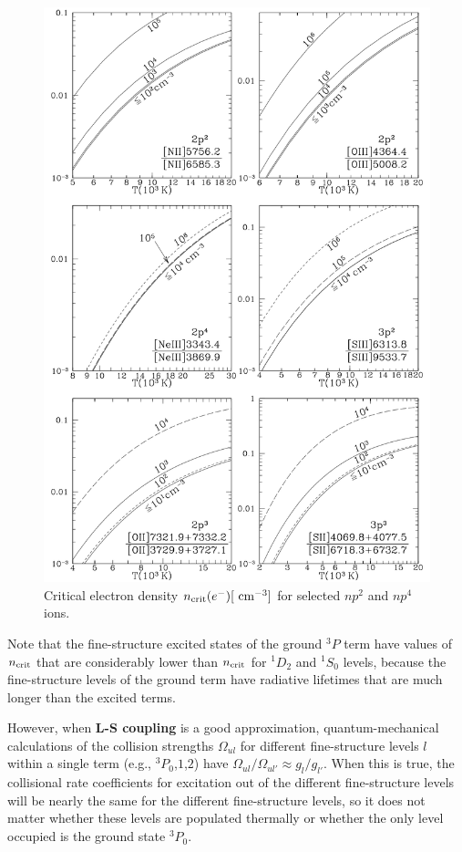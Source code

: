 \documentclass[a4paper,10pt]{article}
\begin{document}
\begin{figure}[t!]
    \centering
    \includegraphics[width=14cm]{figures/LineRatios_T.png}
    \caption{\footnotesize{Critical electron density $n_{\rm crit}(e^-)[~{\rm cm^{-3}}]$ for selected $np^2$ and $np^4$ ions.}}
    \label{fig:lineratios_t}
\end{figure}

{\noindent}Note that the fine-structure excited states of the ground $^3P$ term have values of $n_{\rm crit}$ that are considerably lower than $n_{\rm crit}$ for $^1D_2$ and $^1S_0$ levels, because the fine-structure levels of the ground term have radiative lifetimes that are much longer than the excited terms.

{\noindent}However, when \textbf{L-S coupling} is a good approximation, quantum-mechanical calculations of the collision strengths $\Omega_{ul}$ for different fine-structure levels $l$ within a single term (e.g., $^3P_0$,$1$,$2$) have $\Omega_{ul}/\Omega_{ul'}\approx g_l/g_{l'}$. When this is true, the collisional rate coefficients for excitation out of the different fine-structure levels will be nearly the same for the different fine-structure levels, so it does not matter whether these levels are populated thermally or whether the only level occupied is the ground state $^3P_0$.
\end{document}
